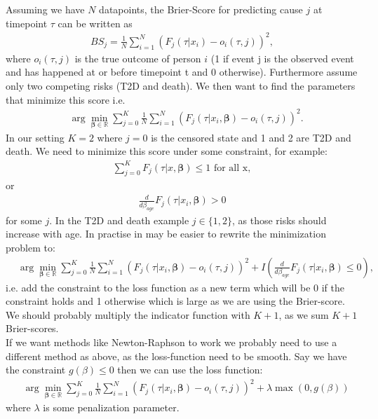 \documentclass[11pt]{article}
\begin{document}
Assuming we have \(N\) datapoints, the Brier-Score for predicting cause \(j\) at timepoint \(\tau\) can be written as
\begin{align*}
BS_j = \frac{1}{N}\sum_{i = 1}^N(F_j(\tau|x_i)-o_i(\tau,j))^2,
\end{align*}
where \(o_i(\tau,j)\) is the true outcome of person \(i\) (1 if event j is the observed event and has happened at or before timepoint t and 0 otherwise). Furthermore assume only two competing risks (T2D and death). We then want to find the parameters that minimize this score i.e.
\begin{align*}
&\arg\min_{\boldsymbol{\beta}\in\mathbb{R}}\sum_{j = 0}^K\frac{1}{N}\sum_{i = 1}^N(F_j(\tau|x_i,\boldsymbol{\beta})-o_i(\tau,j))^2.
\end{align*}
In our setting \(K = 2\) where \(j = 0\) is the censored state and 1 and 2 are T2D and death. We need to minimize this score under some constraint, for example:
\begin{align*}
\sum_{j = 0}^K F_j(\tau|x,\boldsymbol{\beta})\leq 1 \text{ for all x},
\end{align*}
or
\begin{align*}
\frac{d}{d\beta_{age}}F_j(\tau|x_i,\boldsymbol{\beta})>0
\end{align*}
for some \(j\). In the T2D and death example \(j\in\{1,2\}\), as those risks should increase with age. In practise in may be easier to rewrite the minimization problem to:
\begin{align*}
&\arg\min_{\boldsymbol{\beta}\in\mathbb{R}}\sum_{j = 0}^K\frac{1}{N}\sum_{i = 1}^N(F_j(\tau|x_i,\boldsymbol{\beta})-o_i(\tau,j))^2+ I\left(\frac{d}{d\beta_{age}}F_j(\tau|x_i,\boldsymbol{\beta})\leq0\right),
\end{align*}
i.e. add the constraint to the loss function as a new term which will be 0 if the constraint holds and 1 otherwise which is large as we are using the Brier-score. We should probably multiply the indicator function with \(K+1\), as we sum \(K+1\) Brier-scores. \\[0pt]
If we want methods like Newton-Raphson to work we probably need to use a different method as above, as the loss-function need to be smooth. Say we have the constraint \(g(\beta)\leq 0\) then we can use the loss function:
\begin{align*}
&\arg\min_{\boldsymbol{\beta}\in\mathbb{R}}\sum_{j = 0}^K\frac{1}{N}\sum_{i = 1}^N(F_j(\tau|x_i,\boldsymbol{\beta})-o_i(\tau,j))^2+\lambda\max(0,g(\beta))
\end{align*}
where \(\lambda\) is some penalization parameter. 
\end{document}
